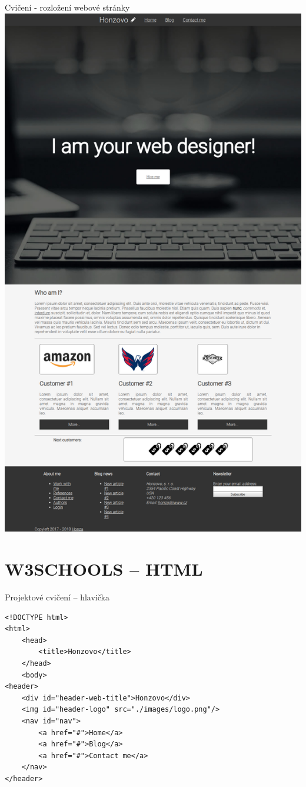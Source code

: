 \documentclass{beamer}
\begin{document}
\begin{frame}{Cvičení - rozložení webové stránky}
  \includegraphics[scale=0.1]{project}
\end{frame}

\section{W3SCHOOLS -- HTML}

\begin{frame}[fragile, shrink=0]{Projektové cvičení -- hlavička}

\begin{lstlisting}[language=HTML5]
<!DOCTYPE html>
<html>
	<head>
		<title>Honzovo</title>
	</head>
	<body>
<header>
    <div id="header-web-title">Honzovo</div>
    <img id="header-logo" src="./images/logo.png"/>
    <nav id="nav">
        <a href="#">Home</a>
        <a href="#">Blog</a>
        <a href="#">Contact me</a>
    </nav>
</header>
\end{lstlisting}
	
\end{frame}
\end{document}
